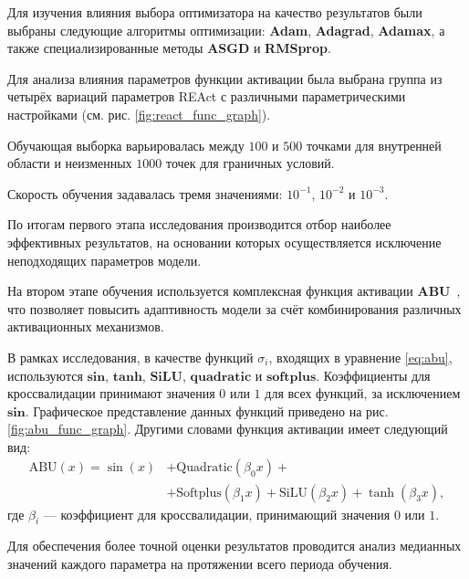 Для изучения влияния выбора оптимизатора на качество результатов были выбраны
следующие алгоритмы оптимизации: \textbf{Adam}, \textbf{Adagrad}, \textbf{Adamax},
а также специализированные методы \textbf{ASGD} и \textbf{RMSprop}.

Для анализа влияния параметров функции активации была выбрана группа из четырёх вариаций параметров
REAct с различными параметрическими настройками (см. рис. \ref{fig:react_func_graph}).


Обучающая выборка варьировалась между $100$ и $500$ точками для внутренней
области и неизменных $1000$ точек для граничных условий. 

Скорость обучения задавалась тремя значениями: $10^{-1}$, $10^{-2}$ и $10^{-3}$.

По итогам первого этапа исследования производится отбор наиболее эффективных результатов,
на основании которых осуществляется исключение неподходящих параметров модели.



На втором этапе обучения используется комплексная функция активации
\textbf{ABU}~\cite{Sutfeld2018-io}, что позволяет повысить адаптивность модели за счёт
комбинирования различных активационных механизмов.

В рамках исследования, в качестве функций $\sigma_i$, входящих в уравнение \eqref{eq:abu},
используются $\mathbf{sin}$, $\mathbf{tanh}$, $\mathbf{SiLU}$, $\mathbf{quadratic}$ и
$\mathbf{softplus}$. Коэффициенты для кроссвалидации принимают значения $0$ или $1$ для всех
функций, за исключением $\mathbf{sin}$. Графическое представление данных функций приведено
на рис. \ref{fig:abu_func_graph}.
Другими словами функция активации имеет следующий вид:
\begin{equation}
    \begin{split}
        \text{ABU}(x) = \sin(x) &+ \text{Quadratic}(\beta_0 x) + \\
        &+ \text{Softplus}(\beta_1 x) + \text{SiLU}(\beta_2 x) + \tanh(\beta_3 x),
    \end{split}
    \label{eq:abu_custom}
\end{equation}
где $\beta_i$ --- коэффициент для кроссвалидации,  принимающий значения $0$ или $1$.


Для обеспечения более точной оценки результатов проводится анализ медианных значений каждого
параметра на протяжении всего периода обучения.